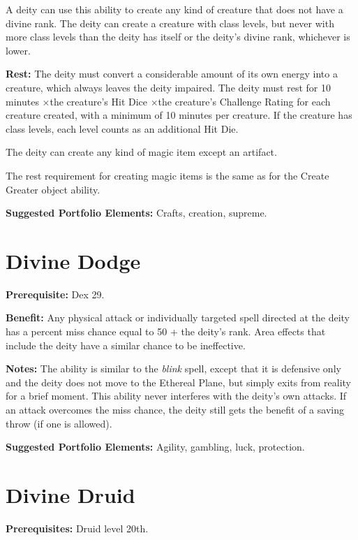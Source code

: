 \documentclass{article}
\begin{document}
A deity can use this ability to create any kind of creature that does not have 
a divine rank. The deity can create a creature with class levels, but never with 
more class levels than the deity has itself or the deity's divine rank, whichever 
is lower.

\textbf{Rest: }The deity must convert a considerable amount of its own energy into 
a creature, which always leaves the deity impaired. The deity must rest for 10 
minutes \ensuremath{\times}the creature's Hit Dice \ensuremath{\times}the creature's 
Challenge Rating for each creature created, with a minimum of 10 minutes per creature. 
If the creature has class levels, each level counts as an additional Hit Die. 

The deity can create any kind of magic item except an artifact.

The rest requirement for creating magic items is the same as for the Create Greater 
object ability.

\textbf{Suggested Portfolio Elements:} Crafts, creation, supreme.

\vspace{12pt}
\section*{Divine Dodge}

\textbf{Prerequisite:} Dex 29.

\textbf{Benefit:} Any physical attack or individually targeted spell directed at 
the deity has a percent miss chance equal to 50 + the deity's rank. Area effects 
that include the deity have a similar chance to be ineffective.

\textbf{Notes:} The ability is similar to the \textit{blink }spell, except that 
it is defensive only and the deity does not move to the Ethereal Plane, but simply 
exits from reality for a brief moment. This ability never interferes with the deity's 
own attacks. If an attack overcomes the miss chance, the deity still gets the benefit 
of a saving throw (if one is allowed).

\textbf{Suggested Portfolio Elements:} Agility, gambling, luck, protection.

\vspace{12pt}
\section*{Divine Druid}

\textbf{Prerequisites:} Druid level 20th.
\end{document}
